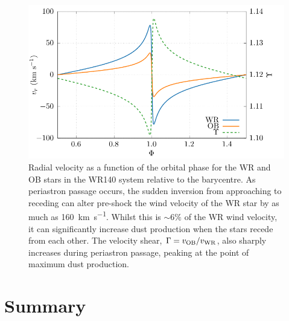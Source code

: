 \begin{figure}
  \centering
  \includegraphics{assets/radial-velocity/radial-shear.pdf}
  \caption[Radial velocity as a function of the orbital phase for the stars in WR140]{Radial velocity as a function of the orbital phase for the WR and OB stars in the WR140 system relative to the barycentre. As periastron passage occurs, the sudden inversion from approaching to receding can alter pre-shock the wind velocity of the WR star by as much as \SI{160}{\kilo\metre\per\second}. Whilst this is $\sim 6\%$ of the WR wind velocity, it can significantly increase dust production when the stars recede from each other. The velocity shear, $\Gamma = v_\text{OB}/v_\text{WR}$, also sharply increases during periastron passage, peaking at the point of maximum dust production.}
  \label{fig:p2-shear}
\end{figure}



\section{Summary}
\label{sec:p2-conclusion}

